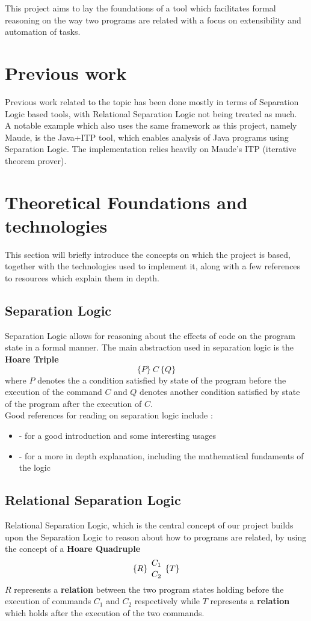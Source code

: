 \documentclass[12pt,a4paper]{article}
\begin{document}
This project aims to lay the foundations of a tool which facilitates formal reasoning on the way two programs are related with a focus on extensibility and automation of tasks.

\section{Previous work}
Previous work related to the topic has been done mostly in terms of Separation Logic based tools, with Relational Separation Logic not being treated as much. \\

A notable example which also uses the same framework as this project, namely Maude, is the Java+ITP\cite{JAVAITP} tool, which enables analysis of Java programs using Separation Logic. The implementation relies heavily on Maude's ITP (iterative theorem prover).

\section{Theoretical Foundations and technologies}
This section will briefly introduce the concepts on which the project is based, together with the technologies used to implement it, along with a few references to resources which explain them in depth.
\subsection{Separation Logic}
Separation Logic allows for reasoning about the effects of code on the program state in a formal manner. The main abstraction used in separation logic is the \textbf{Hoare Triple}
\[ \{P\}\  C\  \{Q\} \]
where \(P\) denotes the a condition satisfied by state of the program before the execution of the command \(C\) and \(Q\) denotes another condition satisfied by state of the program after the execution of \(C\).
\\

Good references for reading on separation logic include : 
\begin{itemize}
	\item \cite{primer} - for a good introduction and some interesting usages
	\item \cite{SeparationLogic} - for a more in depth explanation, including the mathematical fundaments of the logic
\end{itemize} 
\subsection{Relational Separation Logic}
Relational Separation Logic, which is the central concept of our project builds upon the Separation Logic to reason about how to programs are related, by using the concept of a \textbf{Hoare Quadruple}
\[\{R\}\ {C_1 \atop C_2}\   \{T\}\]
\(R\) represents a \textbf{relation} between the two program states holding before the execution of commands \(C_1\) and \(C_2\) respectively while \(T\) represents a \textbf{relation} which holds after the execution of the two commands. 
\\
\end{document}

